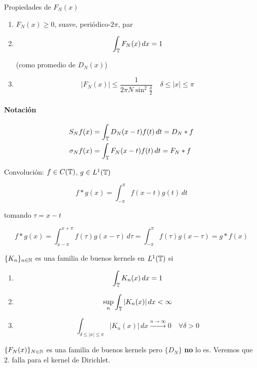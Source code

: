 Propiedades de $F_N(x)$

\begin{enumerate}
    \item $F_N(x)\geq 0$, suave, periódico-$2\pi$, par 
    \item \[\int_{\mathbb{T}} F_N(x)\,dx=1\]
    
    (como promedio de $D_N(x)$)

    \item \[|F_N(x)|\leq \frac{1}{2\pi N\sin^2 \frac{\delta}{2}}\quad \delta\leq |x|\leq \pi\]
\end{enumerate}


\paragraph{Notación}

\begin{align*}
    S_N f(x)&=\int_{\mathbb{T}} D_N(x-t)f(t)\,dt=D_N*f\\
    \sigma_N f(x)&=\int_{\mathbb{T}} F_N(x-t)f(t)\,dt=F_N*f
\end{align*}

Convolución: $f\in C(\mathbb{T})$, $g\in L^1(\mathbb{T})$

\[f*g(x)=\int_{-\pi}^\pi f(x-t)g(t)\,dt\]

tomando $\tau=x-t$

\[f*g(x)=\int_{x-\pi}^{x+\pi} f(\tau)g(x-\tau)\,d\tau=\int_{-\pi}^\pi f(\tau) g(x-\tau)=g*f(x)\]

\begin{fdefinition}
    $\{K_n\}_{n\in\mathbb{N}}$ es una familia de buenos kernels en $L^1(\mathbb{T})$ si

    \begin{enumerate}
        \item \[\int_{\mathbb{T}} K_n(x)\,dx=1\]
        \item \[\sup_n \int_{\mathbb{T}} |K_n(x)|\,dx<\infty\]
        \item \[\int_{\delta\leq |x|\leq \pi} |K_n(x)|\,dx \xrightarrow{n\to\infty} 0\quad \forall \delta >0\]
    \end{enumerate}
\end{fdefinition}

\begin{fnote}
    $\{F_N(x)\}_{N\in\mathbb{N}}$ es una familia de buenos kernels pero $\{D_N\}$ \textbf{no} lo es. Veremos que 2. falla para el kernel de Dirichlet.
\end{fnote}


